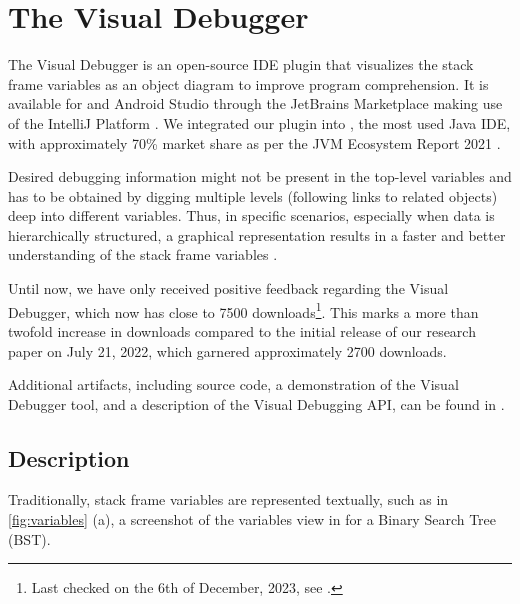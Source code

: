 \documentclass[sigconf]{acmart}
\begin{document}
\section{The Visual Debugger} \label{sec:visualDebugger}

The Visual Debugger is an open-source IDE plugin that visualizes the stack frame variables as an object diagram to improve program comprehension.
It is available for \intellij{} and Android Studio through the JetBrains Marketplace \cite{timkrauterVisualDebuggerIntelliJ2023, timkrauterVisualDebuggerTool2023} making use of the IntelliJ Platform \cite{kurbatovaIntelliJPlatformFramework2021}.
We integrated our plugin into \intellij{}, the most used Java IDE, with approximately 70\% market share as per the JVM Ecosystem Report 2021 \cite{brianvermeerJVMEcosystemReport2021}.

Desired debugging information might not be present in the top-level variables and has to be obtained by digging multiple levels (following links to related objects) deep into different variables.
Thus, in specific scenarios, especially when data is hierarchically structured, a graphical representation results in a faster and better understanding of the stack frame variables \cite{krauterVisualDebuggerTool2022}.

Until now, we have only received positive feedback regarding the Visual Debugger, which now has close to 7500 downloads\footnote{Last checked on the 6th of December, 2023, see \cite{timkrauterVisualDebuggerIntelliJ2023}.}.
This marks a more than twofold increase in downloads compared to the initial release of our research paper \cite{krauterVisualDebuggerTool2022} on July 21, 2022, which garnered approximately 2700 downloads.

Additional artifacts, including source code, a demonstration of the Visual Debugger tool, and a description of the Visual Debugging API, can be found in \cite{timkrauterICSE2024Artifacts2023}.

\subsection{Description}

Traditionally, stack frame variables are represented textually, such as in \autoref{fig:variables} (a), a screenshot of the variables view in \intellij{} for a Binary Search Tree (BST).
\end{document}
